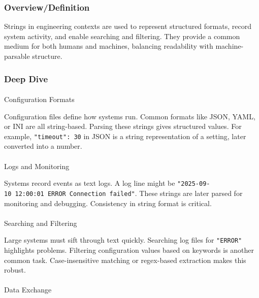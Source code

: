 \documentclass[
  letterpaper,
  DIV=11,
  numbers=noendperiod]{scrreprt}
\makeatletter
\let\oldparagraph\paragraph
\renewcommand{\paragraph}{
    \@ifstar
      \xxxParagraphStar
      \xxxParagraphNoStar
  }
\newcommand{\xxxParagraphStar}[1]{\oldparagraph*{#1}\mbox{}}
\newcommand{\xxxParagraphNoStar}[1]{\oldparagraph{#1}\mbox{}}
\makeatother
\begin{document}
\subsubsection{Overview/Definition}\label{overviewdefinition-3}

Strings in engineering contexts are used to represent structured
formats, record system activity, and enable searching and filtering.
They provide a common medium for both humans and machines, balancing
readability with machine-parsable structure.

\subsubsection{Deep Dive}\label{deep-dive-35}

\paragraph{Configuration Formats}\label{configuration-formats}

Configuration files define how systems run. Common formats like JSON,
YAML, or INI are all string-based. Parsing these strings gives
structured values. For example, \texttt{"timeout":\ 30} in JSON is a
string representation of a setting, later converted into a number.

\paragraph{Logs and Monitoring}\label{logs-and-monitoring}

Systems record events as text logs. A log line might be
\texttt{"2025-09-10\ 12:00:01\ ERROR\ Connection\ failed"}. These
strings are later parsed for monitoring and debugging. Consistency in
string format is critical.

\paragraph{Searching and Filtering}\label{searching-and-filtering}

Large systems must sift through text quickly. Searching log files for
\texttt{"ERROR"} highlights problems. Filtering configuration values
based on keywords is another common task. Case-insensitive matching or
regex-based extraction makes this robust.

\paragraph{Data Exchange}\label{data-exchange}
\end{document}
